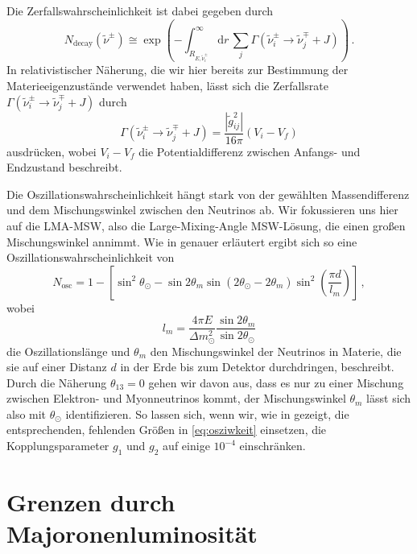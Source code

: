 Die Zerfallswahrscheinlichkeit ist dabei gegeben durch
\begin{equation}
    N_\text{decay}(\tilde{\nu}^\pm) \cong \exp \left(- \int^\infty_{R_{E, \tilde{\nu}^\pm_i}} \mathrm{d}r \, \sum_j \Gamma(\tilde{\nu}^\pm_i \rightarrow \tilde{\nu}^\mp_j + J) \right) \,.
    \label{eq:zerfallswkeit}
\end{equation}
In relativistischer Näherung, die wir hier bereits zur Bestimmung der Materieeigenzustände verwendet haben, lässt sich die Zerfallsrate $\Gamma(\tilde{\nu}^\pm_i \rightarrow \tilde{\nu}^\mp_j + J)$ durch
\begin{equation}
    \Gamma(\tilde{\nu}^\pm_i \rightarrow \tilde{\nu}^\mp_j + J) = \frac{|\tilde{g}^2_{i j}|}{16 \pi} \left(V_i - V_f \right)
    \label{eq:zerfallsrate}
\end{equation}
ausdrücken, wobei $V_i - V_f$ die Potentialdifferenz zwischen Anfangs- und Endzustand beschreibt.

Die Oszillationswahrscheinlichkeit hängt stark von der gewählten Massendifferenz und dem Mischungswinkel zwischen den Neutrinos ab.
Wir fokussieren uns hier auf die LMA-MSW, also die Large-Mixing-Angle MSW-Lösung, die einen großen Mischungswinkel annimmt.
Wie in \cite{ueberlebenswkeit} genauer erläutert ergibt sich so eine Oszillationswahrscheinlichkeit von
\begin{equation}
    N_\text{osc} = 1 - \left[\sin^2\theta_\odot - \sin 2\theta_m \sin\left(2\theta_\odot - 2 \theta_m\right) \sin^2 \left(\frac{\pi d}{l_m}\right)\right] \,,
    \label{eq:osziwkeit}
\end{equation}
wobei
\begin{equation*}
    l_m = \frac{4 \pi E}{\Delta m^2_\odot} \frac{\sin2\theta_m}{\sin2\theta_\odot}
\end{equation*}
die Oszillationslänge und $\theta_m$ den Mischungswinkel der Neutrinos in Materie, die sie auf einer Distanz $d$ in der Erde bis zum Detektor durchdringen, beschreibt.
Durch die Näherung $\theta_{1 3} = 0$ gehen wir davon aus, dass es nur zu einer Mischung zwischen Elektron- und Myonneutrinos kommt, der Mischungswinkel $\theta_m$ lässt sich also mit $\theta_\odot$ identifizieren.
So lassen sich, wenn wir, wie in \cite{supernovaboundsdasandere} gezeigt, die entsprechenden, fehlenden Größen in \eqref{eq:osziwkeit} einsetzen, die Kopplungsparameter $g_1$ und $g_2$ auf einige $10^{-4}$ einschränken.

\section{Grenzen durch Majoronenluminosität}

